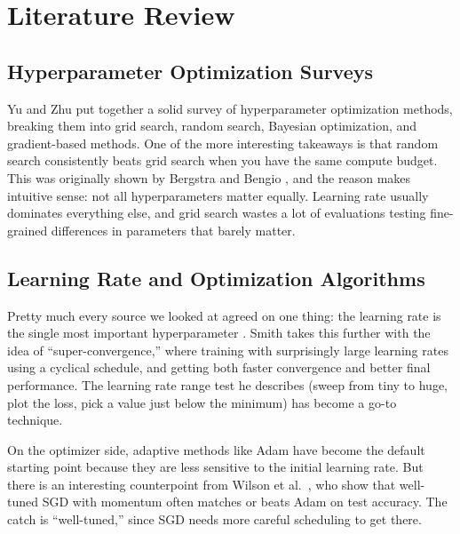 \documentclass[12pt, letterpaper]{article}
\begin{document}
\section{Literature Review}

\subsection{Hyperparameter Optimization Surveys}

Yu and Zhu \cite{yu2020hyper} put together a solid survey of hyperparameter optimization methods, breaking them into grid search, random search, Bayesian optimization, and gradient-based methods. One of the more interesting takeaways is that random search consistently beats grid search when you have the same compute budget. This was originally shown by Bergstra and Bengio \cite{bergstra2012random}, and the reason makes intuitive sense: not all hyperparameters matter equally. Learning rate usually dominates everything else, and grid search wastes a lot of evaluations testing fine-grained differences in parameters that barely matter.

\subsection{Learning Rate and Optimization Algorithms}

Pretty much every source we looked at agreed on one thing: the learning rate is the single most important hyperparameter \cite{goodfellow2016deep}. Smith \cite{smith2018disciplined} takes this further with the idea of ``super-convergence,'' where training with surprisingly large learning rates using a cyclical schedule, and getting both faster convergence and better final performance. The learning rate range test he describes (sweep from tiny to huge, plot the loss, pick a value just below the minimum) has become a go-to technique.

On the optimizer side, adaptive methods like Adam \cite{kingma2015adam} have become the default starting point because they are less sensitive to the initial learning rate. But there is an interesting counterpoint from Wilson et al.\ \cite{wilson2017marginal}, who show that well-tuned SGD with momentum often matches or beats Adam on test accuracy. The catch is ``well-tuned,'' since SGD needs more careful scheduling to get there.
\end{document}
